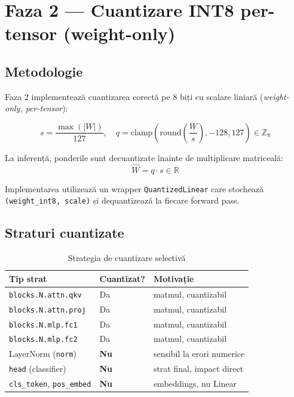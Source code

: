 \documentclass[12pt,a4paper]{article}
\begin{document}
\section{Faza 2 — Cuantizare INT8 per-tensor (weight-only)}

\subsection{Metodologie}

Faza 2 implementează cuantizarea corectă pe 8 biți cu scalare liniară
(\emph{weight-only, per-tensor}):

\begin{equation}
  s = \frac{\max(|W|)}{127}, \quad
  q = \mathrm{clamp}\!\left(\mathrm{round}\!\left(\frac{W}{s}\right), -128, 127\right)
  \in \mathbb{Z}_{8}
\end{equation}

La inferență, ponderile sunt decuantizate înainte de multiplicare matriceală:
\begin{equation}
  \hat{W} = q \cdot s \in \mathbb{R}
\end{equation}

Implementarea utilizează un wrapper \texttt{QuantizedLinear} care stochează
\texttt{(weight\_int8, scale)} și dequantizează la fiecare forward pass.

\subsection{Straturi cuantizate}

\begin{table}[H]
  \centering
  \caption{Strategia de cuantizare selectivă}
  \begin{tabular}{lll}
    \toprule
    \textbf{Tip strat} & \textbf{Cuantizat?} & \textbf{Motivație} \\
    \midrule
    \texttt{blocks.N.attn.qkv}  & Da & matmul, cuantizabil \\
    \texttt{blocks.N.attn.proj} & Da & matmul, cuantizabil \\
    \texttt{blocks.N.mlp.fc1}   & Da & matmul, cuantizabil \\
    \texttt{blocks.N.mlp.fc2}   & Da & matmul, cuantizabil \\
    LayerNorm (\texttt{norm})   & \textbf{Nu} & sensibil la erori numerice \\
    \texttt{head} (classifier)  & \textbf{Nu} & strat final, impact direct \\
    \texttt{cls\_token}, \texttt{pos\_embed} & \textbf{Nu} & embeddings, nu Linear \\
    \bottomrule
  \end{tabular}
  \label{tab:quant_strategy}
\end{table}
\end{document}
